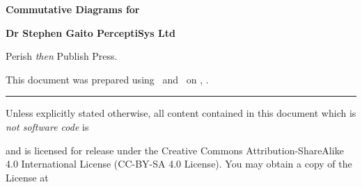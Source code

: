 
\startmakeup

\blank[5cm]
  
\startalignment[center]
\dontleavehmode
\tfd\bf
Commutative Diagrams for \ConTeXt
\stopalignment

\blank[1cm]

\startalignment[center]
\dontleavehmode
\tfc\bf
\stopalignment

\blank[1cm]

\startalignment[center]
\dontleavehmode
\tfb\bf
\stopalignment

\blank[8cm]

\startalignment[flushright]
\dontleavehmode
\tfa\bf
\bTABLE
  \setupTABLE[r][each][frame=off]
  \bTR \bTD Dr Stephen Gaito \eTD \eTR
  \bTR \bTD PerceptiSys Ltd \eTD \eTR
  \bTR \bTD \date \eTD \eTR
\eTABLE
\stopalignment

\blank[5cm]

\startalignment[center]
Perish \emph{then} Publish Press.
\stopalignment

\stopmakeup

\startmakeup

\blank[6cm]



This document was prepared using \ConTeXt\ and \LuaTeX\ on 
\currentdate[month] \currentdate[day], \currentdate[year].


\blank

\hrule
\blank[medium]

Unless explicitly stated otherwise, all content contained in this
document which is \emph{not software code} is

\blank[small]

\startcenteraligned
{}
\stopcenteraligned

\blank[small]

and is licensed for release under the Creative Commons
Attribution-ShareAlike 4.0 International License (CC-BY-SA 4.0 License).
You may obtain a copy of the License at

\blank[small]

\startcenteraligned
{}
\stopcenteraligned


